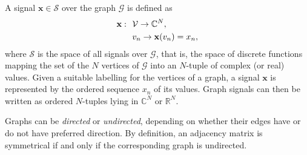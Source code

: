 A signal $ \mathbf{x} \in \mathcal{S}$ over the graph $ \mathcal{G} $ is defined as
\begin{align}\label{eq:def_sinal}
\mathbf{x}: \ \ &\mathcal{V} \rightarrow \mathbb{C}^{N}, \notag \\
& v_n \rightarrow \mathbf{x}(v_n) = x_n,
\end{align}
where $ \mathcal{S} $ is the space of all signals over $ \mathcal{G} $, that is, the space of discrete functions mapping the set of the $ N $ vertices of $ \mathcal{G} $ into an $ N $-tuple of complex (or real) values. Given a suitable labelling for the vertices of a graph, a signal $ \mathbf{x} $ is represented by the ordered sequence $x_n$ of its values. Graph signals can then be written as ordered $ N $-tuples lying in $ \mathbb{C}^N $ or $ \mathbb{R}^N $.%

Graphs can be \emph{directed} or \emph{undirected}, depending on whether their edges have or do not have preferred direction. By definition, an adjacency matrix is symmetrical if and only if the corresponding graph is undirected.

